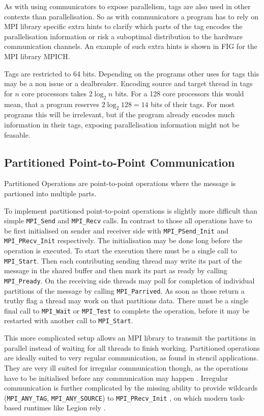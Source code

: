\documentclass[sigconf]{acmart}
\begin{document}
As with using communicators to expose parallelism, tags are also used in other contexts than parallelisation.
So as with communicators a program has to rely on MPI library specific extra hints to clarify which parts of the tag encodes the parallelisation information or risk a suboptimal distribution to the hardware communication channels.
An example of such extra hints is shown in FIG for the MPI library MPICH. %

Tags are restricted to 64 bits.
Depending on the programs other uses for tags this may be a non issue or a dealbreaker.
Encoding source and target thread in tags for $n$ core processors takes $2\log_2{n}$ bits.
For a 128 core processors this would mean, that a program reserves $2\log_2{128} = 14$ bits of their tags.
For most programs this will be irrelevant, but if the program already encodes much information in their tags, exposing parallelisation information might not be feasable.

\subsection{Partitioned Point-to-Point Communication}


Partitioned Operations are point-to-point operations where the message is partioned into multiple parts.

To implement partitioned point-to-point operations is slightly more difficult than simple \verb|MPI_Send| and \verb|MPI_Recv| calls.
In contrast to those all operations have to be first initialised on sender and receiver side with \verb|MPI_PSend_Init| and \verb|MPI_PRecv_Init| respectively.
The initialisation may be done long before the operation is executed.
To start the execution there must be a single call to \verb|MPI_Start|.
Then each contributing sending thread may write its part of the message in the shared buffer and then mark its part as ready by calling \verb|MPI_Pready|.
On the receiving side threads may poll for completion of individual partitions of the message by calling \verb|MPI_Parrived|.
As soon as those return a truthy flag a thread may work on that partitions data.
There must be a single final call to \verb|MPI_Wait| or \verb|MPI_Test| to complete the operation, before it may be restarted with another call to \verb|MPI_Start|.

This more complicated setup allows an MPI library to transmit the partitions in parallel instead of waiting for all threads to finish working.
Partitioned operations are ideally suited to very regular communication, as found in stencil applications.
They are very ill suited for irregular communication though, as the operations have to be initialised before any communication may happen \cite{zambreLessonsLearned2022}.
Irregular communication is further complicated by the missing ability to provide wildcards (\verb|MPI_ANY_TAG|, \verb|MPI_ANY_SOURCE|) to \verb|MPI_PRecv_Init| \cite{mpi40}, on which modern task-based runtimes like Legion rely \cite{zambreLessonsLearned2022}.
\end{document}
